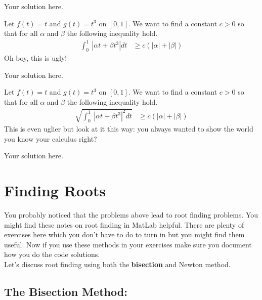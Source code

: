 \documentclass[11pt]{SelfArxOneColBMN}
\begin{document}
\begin{solution}
Your solution here.
\end{solution}

\begin{exercise}
Let $f(t) = t$ and $g(t) = t^3$ on $[0,1]$.
We want to find a constant $c>0$ so that for all $\alpha$ and
$\beta$ the following inequality hold.
\begin{eqnarray*}
\int_0^1 \: | \alpha t + \beta t^3| dt &\geq c( |\alpha| + |\beta|)
\end{eqnarray*}
\noindent
Oh boy, this is ugly!
\end{exercise}

\begin{solution}
Your solution here.
\end{solution}
	
\begin{exercise}
Let $f(t) = t$ and $g(t) = t^3$ on $[0,1]$.
We want to find a constant $c>0$ so that for all $\alpha$ and
$\beta$ the following inequality hold.
\begin{eqnarray*}
\sqrt{\int_0^1 \: | \alpha t + \beta t^3|^2 dt} &\geq c( |\alpha| + |\beta|)
\end{eqnarray*}
\noindent
This is even uglier but look at it this way: you always wanted to
show the world you know your calculus right?
\end{exercise}

\begin{solution}
Your solution here.
\end{solution}

\section{Finding Roots}

You probably noticed that the problems above lead to root finding
problems.  You might find these notes on root finding in MatLab helpful.
There are plenty of exercises here which you don't have to do
to turn in but you might find them useful.  Now if you use these methods
in your exercises make sure you document how you do the code solutions.\\

\noindent
Let's discuss root finding using both the {\bf bisection} and
{Newton} method.

\subsection{The Bisection Method:}
\end{document}
